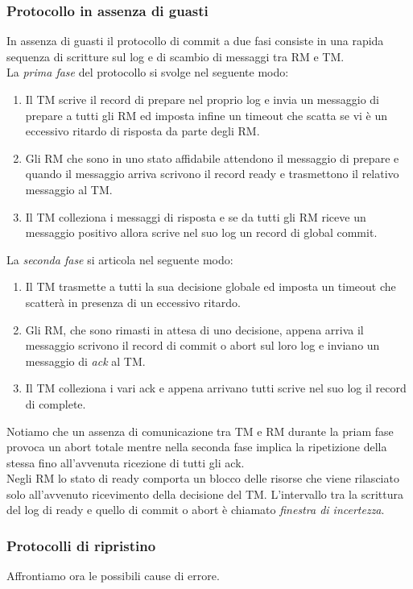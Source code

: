 \subsubsection{Protocollo in assenza di guasti}
In assenza di guasti il protocollo di commit a due fasi consiste in una rapida sequenza di scritture sul log e di scambio di messaggi tra RM e TM.\\
La \emph{prima fase} del protocollo si svolge nel seguente modo:
\begin{enumerate}
\item Il TM scrive il record di \textsf{prepare} nel proprio log e invia un messaggio di prepare a tutti gli RM ed imposta infine un timeout che scatta se vi è un eccessivo ritardo di risposta da parte degli RM.
\item Gli RM che sono in uno stato affidabile attendono il messaggio di prepare e quando il messaggio arriva scrivono il record \textsf{ready} e trasmettono il relativo messaggio al TM.
\item Il TM colleziona i messaggi di risposta e se da tutti gli RM riceve un messaggio positivo allora scrive nel suo log un record di \textsf{global commit}.
\end{enumerate}
La \emph{seconda fase} si articola nel seguente modo:
\begin{enumerate}
\item Il TM trasmette a tutti la sua decisione globale ed imposta un timeout che scatterà in presenza di un eccessivo ritardo.
\item Gli RM, che sono rimasti in attesa di uno decisione, appena arriva il messaggio scrivono il record di \textsf{commit} o \textsf{abort} sul loro log e inviano un messaggio di \emph{ack} al TM.
\item Il TM colleziona i vari ack e appena arrivano tutti scrive nel suo log il record di \textsf{complete}.

\end{enumerate}
Notiamo che un assenza di comunicazione tra TM e RM durante la priam fase provoca un abort totale mentre nella seconda fase implica la ripetizione della stessa fino all'avvenuta ricezione di tutti gli ack.\\
Negli RM lo stato di ready comporta un blocco delle risorse che viene rilasciato solo all'avvenuto ricevimento della decisione del TM. L'intervallo tra la scrittura del log di \textsf{ready} e quello di \textsf{commit} o \textsf{abort} è chiamato \emph{finestra di incertezza}.
\subsubsection{Protocolli di ripristino}
Affrontiamo ora le possibili cause di errore.
